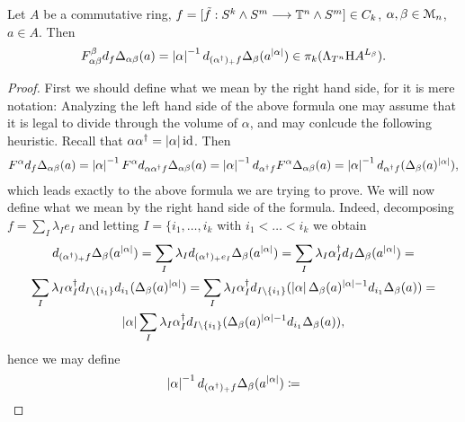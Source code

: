 \begin{cor}\label{cor_fdw_relation_arbitrary_dimensions}
Let $A$ be a commutative ring, $f = [\tilde{f}: S^k \wedge S^m \longrightarrow \mathbb{T}^n \wedge S^m] \in C_k$, $\alpha,\beta \in \mathcal{M}_n$, $a \in A$. Then
\begin{equation*}
  F_{\alpha\beta}^\beta d_f \Delta_{\alpha\beta} (a) =%
  \abs{\alpha}^{-1}d_{(\alpha^\dagger)_+ f} \Delta_{\beta}(a^{\abs{\alpha}})%
  \in \pi_k (\Lambda_{T^n} \H A ^{L_\beta}).%
\end{equation*}
\begin{proof}
 First we should define what we mean by the right hand side, for it is mere notation: Analyzing the left hand side of the above formula one may assume that it is legal to divide through the volume of $\alpha$, and may conlcude the following heuristic. Recall that $\alpha \alpha^\dagger = \left\vert\alpha\right\vert \operatorname{id}$. Then
\begin{gather*}
  F^\alpha d_f \Delta_{\alpha\beta} (a) = %
    \abs{\alpha}^{-1} F^\alpha d_{\alpha \alpha^\dagger f}%
      \Delta_{\alpha\beta} (a) = %
    \abs{\alpha}^{-1} d_{\alpha^\dagger f} F^\alpha
      \Delta_{\alpha\beta} (a) = %
    \abs{\alpha}^{-1} d_{\alpha^\dagger f}
      ( \Delta_{\beta} (a)^{\abs{\alpha}} ),%
\end{gather*}
which leads exactly to the above formula we are trying to prove. We will now define what we mean by the right hand side of the formula. Indeed, decomposing $f = \sum_I \lambda_I e_I$ and letting $I = \{i_1, \ldots , i_k$ with $i_1 < \ldots < i_k$ we obtain
\begin{gather*}
  d_{(\alpha^\dagger)_+ f} \Delta_{\beta}(a^{\abs{\alpha}}) = %
  \sum_I \lambda_I d_{(\alpha^\dagger)_+ e_I} \Delta_{\beta}
    (a^{\abs{\alpha}}) = %
  \sum_I \lambda_I \alpha^\dagger_I d_I \Delta_{\beta}(a^{\abs{\alpha}}) = \\%
  \sum_I \lambda_I \alpha^\dagger_I d_{I \setminus \{i_1\}} d_{i_1}
    (\Delta_{\beta}(a)^{\abs{\alpha}}) = %
  \sum_I \lambda_I \alpha^\dagger_I d_{I \setminus \{i_1\}} (
    \abs{\alpha} \Delta_{\beta}(a)^{\abs{\alpha}-1} d_{i_1} \Delta_{\beta}(a) ) = \\%
  \abs{\alpha} \sum_I \lambda_I \alpha^\dagger_I d_{I \setminus \{i_1\}}
    (\Delta_{\beta}(a)^{\abs{\alpha}-1} d_{i_1} \Delta_{\beta}(a)),%
\end{gather*}
hence we may define
\begin{equation*}
	\abs{\alpha}^{-1} d_{(\alpha^\dagger)_+ f} \Delta_{\beta}(a^{\abs{\alpha}}) \defas %

\end{equation*}
\end{proof}
\end{cor}
